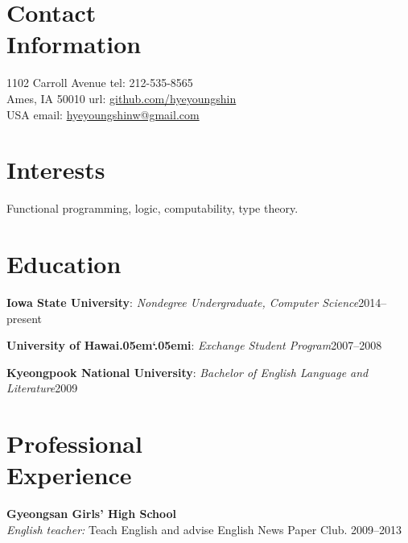 \documentclass[margin,line]{resume}
\begin{document}
\newcommand{\Hawaii}{Hawai\kern.05em`\kern.05em\relax i}
\newcommand{\Manoa}{M\=anoa}


\begin{resume}

    \section{\mysidestyle Contact\\Information}
     1102 Carroll Avenue            \hfill tel: 212-535-8565\\
     Ames, IA 50010                 \hfill url: \href{https://github.com/hyeyoungshin}{github.com/hyeyoungshin}\\
     USA  \hfill             \hfill email:  \href{mailto:hyeyoungshinw@gmail.com}{hyeyoungshinw@gmail.com}

    \section{\mysidestyle Interests}

    Functional programming, logic, computability, type theory.
    
    \section{\mysidestyle Education}

    \textbf{Iowa State University}:  %
    \textsl{Nondegree Undergraduate, Computer Science}\hfill 2014--present
    
        \textbf{University of \Hawaii}: \textsl{Exchange Student Program}\hfill  2007--2008  
        
    \textbf{Kyeongpook National University}:  %
    \textsl{Bachelor of English Language and Literature}\hfill 2009



      
    \section{\mysidestyle Professional\\Experience}
    \textbf{Gyeongsan Girls' High School}\\
    \textsl{English teacher:} Teach English and advise English News Paper Club.  \hfill 2009--2013



\end{resume}
\end{document}
